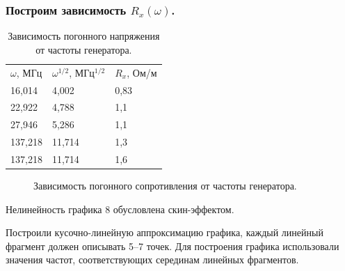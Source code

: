 \documentclass[12pt]{article}
\begin{document}
\begin{flushleft}
\subsubsection{Построим зависимость $R_x(\omega)$.}

\begin{table}[!h]
\caption{Зависимость погонного напряжения от частоты генератора.}
\begin{tabular}{lll}
$\omega$, МГц  & $\omega ^{1/2}$, МГц$^{1/2}$ & $R_x$, Ом/м \\
16,014  & 4,002                                            & 0,83     \\
22,922  & 4,788                                            & 1,1      \\
27,946  & 5,286                                            & 1,1      \\
137,218 & 11,714                                           & 1,3      \\
137,218 & 11,714                                           & 1,6     
\end{tabular}
\end{table}
\begin{figure}[!h]
\caption{Зависимость погонного сопротивления от частоты генератора.}
\label{ris:image}
\end{figure}
Нелинейность графика 8 обусловлена скин-эффектом.

Построили кусочно-линейную аппроксимацию графика, каждый линейный фрагмент должен описывать 5–7 точек. Для построения графика использовали значения частот, соответствующих серединам линейных фрагментов.

\end{flushleft}
\end{document}
